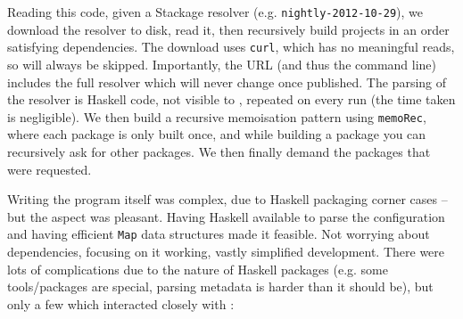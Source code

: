 Reading this code, given a Stackage resolver (e.g. \texttt{nightly-2012-10-29}), we download the resolver to disk, read it, then recursively build projects in an order satisfying dependencies. The download uses \texttt{curl}, which has no meaningful reads, so will always be skipped. Importantly, the URL (and thus the command line) includes the full resolver which will never change once published. The parsing of the resolver is Haskell code, not visible to \Rattle, repeated on every run (the time taken is negligible). We then build a recursive memoisation pattern using \texttt{memoRec}, where each package is only built once, and while building a package you can recursively ask for other packages. We then finally demand the packages that were requested. %

Writing the program itself was complex, due to Haskell packaging corner cases -- but the \Rattle aspect was pleasant. Having Haskell available to parse the configuration and having efficient \texttt{Map} data structures made it feasible. Not worrying about dependencies, focusing on it working, vastly simplified development. There were lots of complications due to the nature of Haskell packages (e.g. some tools/packages are special, parsing metadata is harder than it should be), but only a few which interacted closely with \Rattle:

